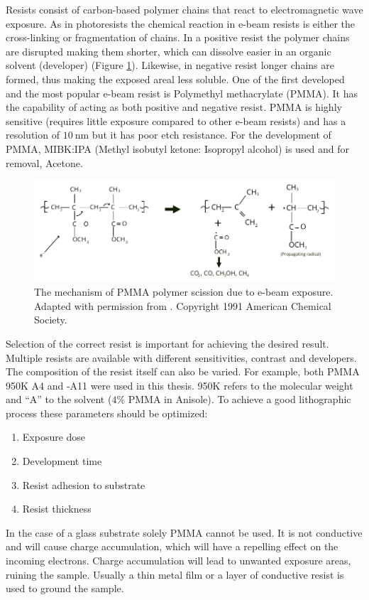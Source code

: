 \documentclass[final]{jyflluk}
\begin{document}
Resists consist of carbon-based polymer chains that react to electromagnetic wave exposure. As in photoresists the chemical reaction in e-beam resists is either the cross-linking or fragmentation of chains. In a positive resist the polymer chains are disrupted making them shorter, which can dissolve easier in an organic solvent (developer) (Figure \ref{fig:PMMA_chem}). Likewise, in negative resist longer chains are formed, thus making the exposed areal less soluble. One of the first developed and the most popular e-beam resist is Polymethyl methacrylate (PMMA). It has the capability of acting as both positive and negative resist. PMMA is highly sensitive (requires little exposure compared to other e-beam resists) and has a resolution of $\SI{10}{\nano \metre}$ but it has poor etch resistance. For the development of PMMA, MIBK:IPA (Methyl isobutyl ketone: Isopropyl alcohol) is used and for removal, Acetone. \cite{EBL_GOOD}

\begin{figure}[h]
    \centering
    \includegraphics[width=1.0\textwidth]{images/PMMA_chem_eq.pdf}
    \caption{The mechanism of PMMA polymer scission due to e-beam exposure. Adapted with permission from \cite{moore_degradation_1991}. Copyright 1991 American Chemical Society.}
    \label{fig:PMMA_chem}
\end{figure}

Selection of the correct resist is important for achieving the desired result. Multiple resists are available with different sensitivities, contrast and developers. The composition of the resist itself can also be varied. For example, both PMMA 950K A4 and -A11 were used in this thesis.  950K refers to the molecular weight and “A” to the solvent ($4 \percent$ PMMA in Anisole). To achieve a good lithographic process these parameters should be optimized:
\begin{enumerate}
    \renewcommand{\labelenumi}{\Roman{enumi}} 
    \setlength{\itemsep}{1pt}
    \setlength{\parskip}{1pt}
        \item Exposure dose
        \item Development time
        \item Resist adhesion to substrate
        \item Resist thickness
\end{enumerate}	
In the case of a glass substrate solely PMMA cannot be used. It is not conductive and  will cause charge accumulation, which will have a repelling effect on the incoming electrons. Charge accumulation will lead to unwanted exposure areas, ruining the sample. Usually a thin metal film or a layer of conductive resist is used to ground the sample.
\end{document}
